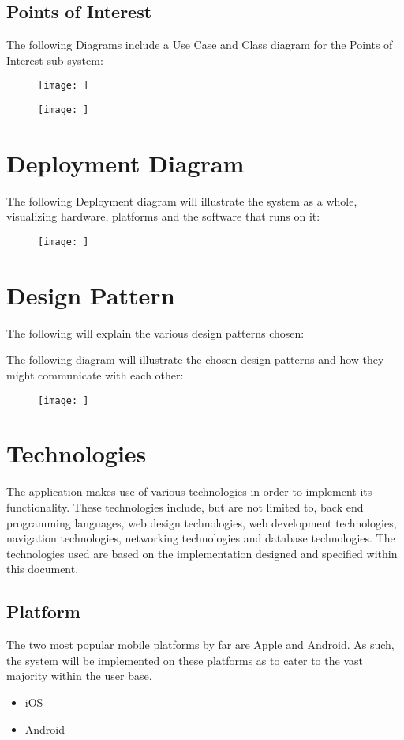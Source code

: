 \documentclass{article}
\begin{document}
	\subsection{Points of Interest}
	The following Diagrams include a Use Case and Class diagram for the Points of Interest sub-system:
	\begin{figure}[h]
  		\texttt{[image: ]}
	\end{figure}
	\begin{figure}[h]
  		\texttt{[image: ]}
	\end{figure}
	
\section{Deployment Diagram}
The following Deployment diagram will illustrate the system as a whole, visualizing hardware, platforms and the software that runs on it:
	\begin{figure}[h]
  		\texttt{[image: ]}
	\end{figure}

\section{Design Pattern}
The following will explain the various design patterns chosen:

The following diagram will illustrate the chosen design patterns and how they might communicate with each other:
	\begin{figure}[h]
  		\texttt{[image: ]}
	\end{figure}

\section{Technologies}
The application makes use of various technologies in order to implement its functionality. These technologies include, but are not limited to, back end programming languages, web design technologies, web development technologies, navigation technologies, networking technologies and database technologies.  The technologies used are based on the implementation designed and specified within this document.  
	\subsection{Platform}
The two most popular mobile platforms by far are Apple and Android.  As such, the system will be implemented on these platforms as to cater to the vast majority within the user base. 
		\begin{itemize}
			\item iOS
			\item Android
		\end{itemize}
\end{document}
